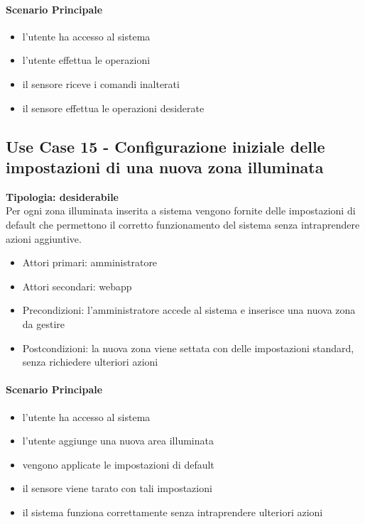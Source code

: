 \documentclass[12pt]{article}
\begin{document}
\paragraph{Scenario Principale}
\begin{itemize}
	\item l'utente ha accesso al sistema
	\item l'utente effettua le operazioni
	\item il sensore riceve i comandi inalterati
	\item il sensore effettua le operazioni desiderate
\end{itemize}

\subsection{Use Case 15 - Configurazione iniziale delle impostazioni di una nuova zona illuminata}
\textbf{Tipologia: desiderabile} \\
Per ogni zona illuminata inserita a sistema vengono fornite delle impostazioni di default che permettono il corretto funzionamento del sistema senza intraprendere azioni aggiuntive.
\begin{itemize}
	\item Attori primari: amministratore
	\item Attori secondari: webapp
	\item Precondizioni: l'amministratore accede al sistema e inserisce una nuova zona da gestire
	\item Postcondizioni: la nuova zona viene settata con delle impostazioni standard, senza richiedere ulteriori azioni
\end{itemize}
\paragraph{Scenario Principale}
\begin{itemize}
	\item l'utente ha accesso al sistema
	\item l'utente aggiunge una nuova area illuminata
	\item vengono applicate le impostazioni di default
	\item il sensore viene tarato con tali impostazioni
	\item il sistema funziona correttamente senza intraprendere ulteriori azioni
\end{itemize}
\end{document}
